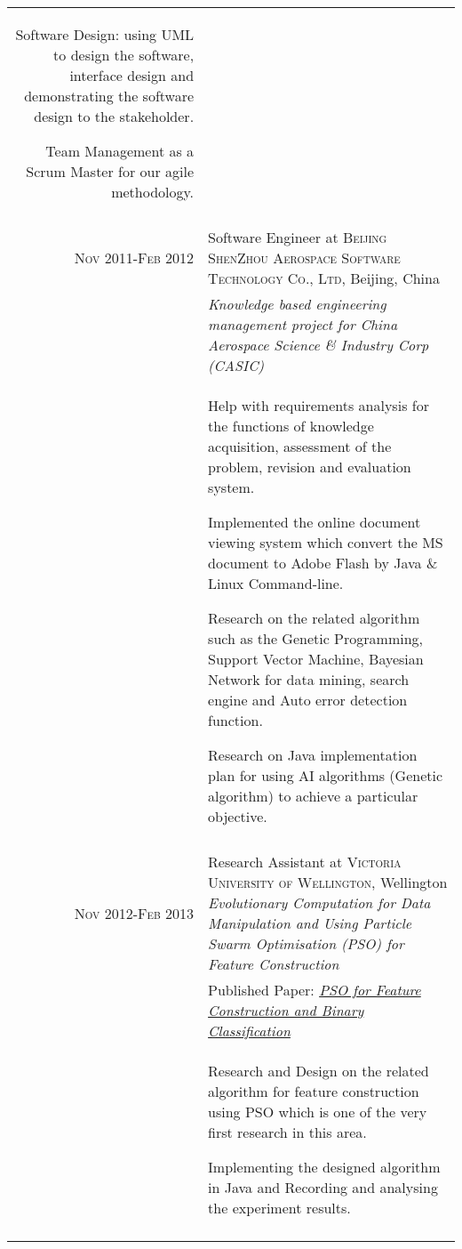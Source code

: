 \documentclass[a4paper,10pt]{article} %
\begin{document}
\begin{tabular}{r|p{11cm}}
{Software Design: using UML to design the software, interface design and demonstrating the software design to the stakeholder.

Team Management as a Scrum Master for our agile methodology.
}\\
\multicolumn{2}{c}{} \\



\textsc{Nov 2011-Feb 2012} & Software Engineer at \textsc{Beijing ShenZhou Aerospace Software Technology Co., Ltd}, Beijing, China \\
&\emph{Knowledge based engineering management project for China Aerospace Science \& Industry Corp (CASIC)}\\
& \footnotesize{
Help with requirements analysis for the functions of knowledge acquisition, assessment of the problem, revision and evaluation system.

Implemented the online document viewing system which convert the MS document to Adobe Flash by Java \& Linux Command-line.

Research on the related algorithm such as the Genetic Programming, Support Vector Machine, Bayesian Network for data mining, search engine and Auto error detection function.

Research on Java implementation plan for using AI algorithms (Genetic algorithm) to achieve a particular objective.
}\\
\multicolumn{2}{c}{} \\




\textsc{Nov 2012-Feb 2013} & Research Assistant at \textsc{Victoria University of Wellington}, Wellington \emph{Evolutionary Computation for Data Manipulation and Using Particle Swarm Optimisation (PSO) for Feature Construction}\\
& Published Paper: \emph{\href{http://dl.acm.org/citation.cfm?id=2463376}{PSO for Feature Construction and Binary Classification}}\\
& \footnotesize{
Research and Design on the related algorithm for feature construction using PSO which is one of the very first research in this area. 

Implementing the designed algorithm in Java and Recording and analysing the experiment results.
}\\
\multicolumn{2}{c}{} \\


\end{tabular}
\end{document}
